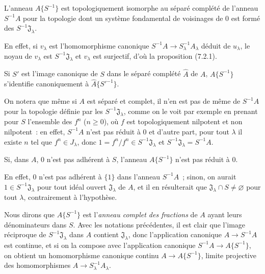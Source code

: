 \begin{proposition}[7.6.2]
\label{0.7.6.2-fr}
L'anneau $A\{S^{-1}\}$ est topologiquement isomorphe au séparé complété de
l'anneau $S^{-1}A$ pour la topologie dont un système fondamental de voisinages
de 0 est formé des $S^{-1}\mathfrak J_\lambda$.
\end{proposition}

En effet, si $v_\lambda$ est l'homomorphisme canonique
$S^{-1}A\to S_\lambda^{-1}A_\lambda$ déduit de $u_\lambda$, le noyau de
$v_\lambda$ est $S^{-1}\mathfrak J_\lambda$ et $v_\lambda$ est surjectif,
d'où la proposition (7.2.1).

\begin{corollary}[7.6.3]
\label{0.7.6.3-fr}
Si $S'$ est l'image canonique de $S$ dans le séparé complété $\widehat A$ de
$A$, $A\{S^{-1}\}$ s'identifie canoniquement à
$\widehat A\{{S'}^{-1}\}$.
\end{corollary}

On notera que même si $A$ est séparé et complet, il n'en est pas de même de
$S^{-1}A$ pour la topologie définie par les
$S^{-1}\mathfrak J_\lambda$, comme on le voit par exemple en prenant pour $S$
l'ensemble des $f^n$ ($n\geq0$), où $f$ est topologiquement nilpotent et non
nilpotent~: en effet, $S^{-1}A$ n'est pas réduit à 0 et d'autre part, pour tout
$\lambda$ il existe $n$ tel que $f^n\in J_\lambda$, donc
$1=f^n/f^n\in S^{-1}\mathfrak J_\lambda$ et
$S^{-1}\mathfrak J_\lambda=S^{-1}A$.


\begin{corollary}[7.6.4]
\label{0.7.6.4-fr}
Si, dans $A$, $0$ n'est pas adhérent à $S$, l'anneau $A\{S^{-1}\}$ n'est pas
réduit à $0$.
\end{corollary}

En effet, $0$ n'est pas adhérent à $\{1\}$ dans l'anneau $S^{-1}A$~; sinon,
on aurait $1\in S^{-1}\mathfrak J_\lambda$ pour tout idéal ouvert
$\mathfrak J_\lambda$ de $A$, et il en résulterait que
$\mathfrak J_\lambda\cap S\neq\varnothing$ pour tout $\lambda$, contrairement
à l'hypothèse.

\begin{env}[7.6.5]
\label{0.7.6.5-fr}
Nous dirons que $A\{S^{-1}\}$ est l'\emph{anneau complet des fractions} de $A$
ayant leurs dénominateurs dans $S$. Avec les notations précédentes, il est clair
que l'image réciproque de $S^{-1}\mathfrak J_\lambda$ dans $A$ contient
$\mathfrak J_\lambda$, donc l'application canonique $A\to S^{-1}A$ est
continue, et si on la compose avec l'application canonique
$S^{-1}A\to A\{S^{-1}\}$, on obtient un homomorphisme canonique continu
$A\to A\{S^{-1}\}$, limite projective des homomorphismes
$A\to S_\lambda^{-1}A_\lambda$.
\end{env}

